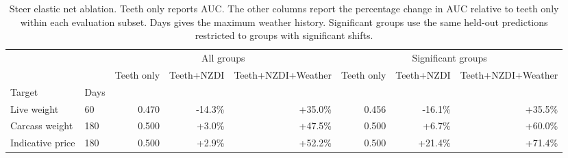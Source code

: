 \begin{table}
\caption{Steer elastic net ablation. Teeth only reports AUC. The other columns report the percentage change in AUC relative to teeth only within each evaluation subset. Days gives the maximum weather history. Significant groups use the same held-out predictions restricted to groups with significant shifts.}
\label{tab:steer_elasticnet_ablation}
\begin{tabular}{llrrrrrr}
\toprule
 &  & \multicolumn{3}{c}{All groups} & \multicolumn{3}{c}{Significant groups} \\
 &  & Teeth only & Teeth+NZDI & Teeth+NZDI+Weather & Teeth only & Teeth+NZDI & Teeth+NZDI+Weather \\
Target & Days &  &  &  &  &  &  \\
\midrule
Live weight & 60 & 0.470 & -14.3\% & +35.0\% & 0.456 & -16.1\% & +35.5\% \\
Carcass weight & 180 & 0.500 & +3.0\% & +47.5\% & 0.500 & +6.7\% & +60.0\% \\
Indicative price & 180 & 0.500 & +2.9\% & +52.2\% & 0.500 & +21.4\% & +71.4\% \\
\bottomrule
\end{tabular}
\end{table}
